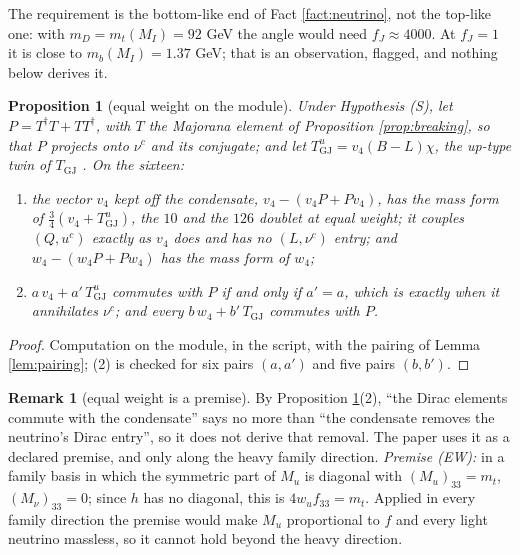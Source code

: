 \documentclass[11pt]{article}
\newtheorem{proposition}[theorem]{Proposition}
\theoremstyle{definition}
\newtheorem{remark}[theorem]{Remark}
\begin{document}
The requirement is the bottom-like end of Fact \ref{fact:neutrino}, not the top-like one: with $m_{D} = m_{t}(M_{I}) = 92$ GeV the angle would need $f_{J} \approx 4000$. At $f_{J} = 1$ it is close to $m_{b}(M_{I}) = 1.37$ GeV; that is an observation, flagged, and nothing below derives it.

\begin{proposition}[equal weight on the module]\label{prop:equalweight}
Under Hypothesis (S), let $P = T^{\dagger}T + TT^{\dagger}$, with $T$ the Majorana element of Proposition \ref{prop:breaking}, so that $P$ projects onto $\nu^{c}$ and its conjugate; and let $T^{u}_{\mathrm{GJ}} = v_{4}(B - L)\chi$, the up-type twin of $T_{\mathrm{GJ}}$ \cite[Prop.~8.1(iv)]{ButlerT13}. On the sixteen:
\begin{enumerate}
\item[(1)] the vector $v_{4}$ kept off the condensate, $v_{4} - (v_{4}P + Pv_{4})$, has the mass form of $\tfrac34(v_{4} + T^{u}_{\mathrm{GJ}})$, the $10$ and the $126$ doublet at equal weight; it couples $(Q, u^{c})$ exactly as $v_{4}$ does and has no $(L, \nu^{c})$ entry; and $w_{4} - (w_{4}P + Pw_{4})$ has the mass form of $w_{4}$;
\item[(2)] $a\,v_{4} + a'\,T^{u}_{\mathrm{GJ}}$ commutes with $P$ if and only if $a' = a$, which is exactly when it annihilates $\nu^{c}$; and every $b\,w_{4} + b'\,T_{\mathrm{GJ}}$ commutes with $P$.
\end{enumerate}
\end{proposition}

\begin{proof}
Computation on the module, in the script, with the pairing of Lemma \ref{lem:pairing}; (2) is checked for six pairs $(a, a')$ and five pairs $(b, b')$.
\end{proof}

\begin{remark}[equal weight is a premise]\label{rem:equalweight}
By Proposition \ref{prop:equalweight}(2), ``the Dirac elements commute with the condensate'' says no more than ``the condensate removes the neutrino's Dirac entry'', so it does not derive that removal. The paper uses it as a declared premise, and only along the heavy family direction. \emph{Premise (EW):} in a family basis in which the symmetric part of $M_{u}$ is diagonal with $(M_{u})_{33} = m_{t}$, $(M_{\nu})_{33} = 0$; since $h$ has no diagonal, this is $4w_{u}f_{33} = m_{t}$. Applied in every family direction the premise would make $M_{u}$ proportional to $f$ and every light neutrino massless, so it cannot hold beyond the heavy direction.
\end{remark}
\end{document}
